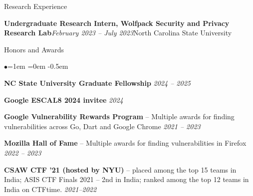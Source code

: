 \documentclass{resume} %
\begin{document}
\begin{rSection}{Research Experience}
\begin{rSubsection}{\bf Undergraduate Research Intern, Wolfpack Security and Privacy Research Lab}{\em February 2023 -- July 2023}{North Carolina State University}{}
\end{rSubsection}
\end{rSection}
\begin{rSection}{Honors and Awards}
\begin{list}{$\bullet$}{\leftmargin=1em \itemindent=0em}
\itemsep -0.5em
\item {\bf NC State University Graduate Fellowship } \hfill {\em 2024 -- 2025}
\item {\bf Google ESCAL8 2024 invitee } \hfill {\em 2024}
\item {\bf Google Vulnerability Rewards Program } -- Multiple awards for finding vulnerabilities across Go, Dart and Google Chrome \hfill {\em 2021 -- 2023}
\item {\bf Mozilla Hall of Fame } -- Multiple awards for finding vulnerabilities in Firefox \hfill {\em 2022 -- 2023}
\item {\bf CSAW CTF '21 (hosted by NYU) } -- placed among the top 15 teams in India; ASIS CTF Finals 2021 -- 2nd in India; ranked among the top 12 teams in India on CTFtime. \hfill {\em 2021--2022}
\end{list}
\end{rSection} 
\end{document}
